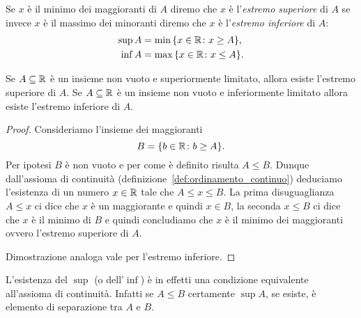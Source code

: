 
\begin{definition}%
  Se $x$ è il minimo dei maggioranti di $A$ diremo che $x$ è
  l'\emph{estremo superiore}%
%
%
  di $A$ se invece $x$ è il massimo dei minoranti diremo che $x$ è
  l'\emph{estremo inferiore}%
%
 di $A$:
  \begin{align*}
  \sup A &= \min {\left\{ x\in {\mathbb R}\colon x\ge A \right\}}, \\
  \inf A &= \max {\left\{ x\in {\mathbb R}\colon x \le A \right\}}.
  \end{align*}
  \index{$\sup$}%
  \index{$\inf$}%
\end{definition}

\begin{theorem}%
  \label{th:sup}%
  \mymark{**}%
  Se $A\subseteq {\mathbb R}$ è un insieme non vuoto
  e superiormente limitato, allora esiste l'estremo superiore di $A$.
  Se $A\subseteq {\mathbb R}$ è un insieme non vuoto e inferiormente limitato 
  allora esiste l'estremo inferiore di $A$.
  \end{theorem}
  \begin{proof}
  \mymark{*}
  Consideriamo l'insieme dei maggioranti
  \[
  B = {\left\{  b\in {\mathbb R} \colon b \ge A \right\}}.
  \]
  Per ipotesi $B$ è non vuoto e per come è definito risulta $A\le B$.
  Dunque dall'assioma di continuità (definizione~\ref{def:ordinamento_continuo}) 
  deduciamo l'esistenza di un numero $x\in {\mathbb R}$
  tale che $A\le x \le B$. La prima disuguaglianza $A\le x$ ci dice che $x$ è un
  maggiorante e quindi $x\in B$, la seconda $x\le B$ ci dice che $x$ è il minimo
  di $B$ e quindi concludiamo che $x$ è il minimo dei maggioranti 
  ovvero l'estremo superiore di $A$.

  Dimostrazione analoga vale per l'estremo inferiore.
\end{proof}

L'esistenza del $\sup$ (o dell'$\inf$)
è in effetti una condizione equivalente all'assioma di continuità.
Infatti se $A\le B$ certamente $\sup A$, se esiste, è elemento 
di separazione tra $A$ e $B$.

